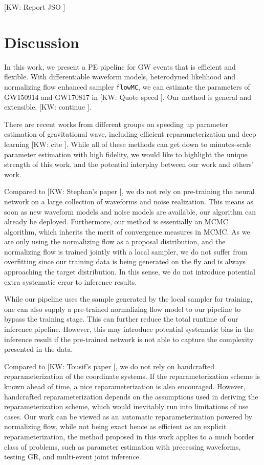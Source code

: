 \documentclass[twocolumn]{aastex631}
\newcommand{\kw}[1]{{\color{rb4}[KW: #1 ]}}
\begin{document}
\kw{Report JSO} 

\section{Discussion}
\label{sec: Discussion}

In this work, we present a PE pipeline for GW events that is efficient and
flexible. With differentiable waveform models, heterodyned likelihood and
normalizing flow enhanced sampler \texttt{flowMC}, we can estimate the
parameters of GW150914 and GW170817 in \kw{Quote speed}. Our method is general
and extensible, \kw{continue}.

There are recent works from different groups on speeding up parameter estimation
of gravitational wave, including efficient reparameterization and deep learning
\kw{cite}. While all of these methods can get down to minutes-scale parameter
estimation with high fidelity, we would like to highlight the unique strength of
this work, and the potential interplay between our work and others' work.

Compared to \kw{Stephan's paper}, we do not rely on pre-training the neural
network on a large collection of waveforms and noise realization. This means as
soon as new waveform models and noise models are available, our algorithm can
already be deployed. Furthermore, our method is essentially an MCMC algorithm,
which inherits the merit of convergence measures in MCMC. As we are only using
the normalizing flow as a proposal distribution, and the normalizing flow is
trained jointly with a local sampler, we do not suffer from overfitting since
our training data is being generated on the fly and is always approaching the
target distribution. In this sense, we do not introduce potential extra
systematic error to inference results.

While our pipeline uses the sample generated by the local sampler for training,
one can also supply a pre-trained normalizing flow model to our pipeline to
bypass the training stage. This can further reduce the total runtime of our
inference pipeline. However, this may introduce potential systematic bias in the
inference result if the pre-trained network is not able to capture the
complexity presented in the data.

Compared to \kw{Tousif's paper}, we do not rely on handcrafted
reparameterization of the coordinate systems. If the reparameterization scheme
is known ahead of time, a nice reparameterization is also encouraged. However,
handcrafted reparameterization depends on the assumptions used in deriving the
reparameterization scheme, which would inevitably run into limitations of use
cases. Our work can be viewed as an automatic reparameterization powered by
normalizing flow, while not being exact hence as efficient as an explicit
reparameterization, the method proposed in this work applies to a much
border class of problems, such as parameter estimation with precessing
waveforms, testing GR, and multi-event joint inference.
\end{document}
